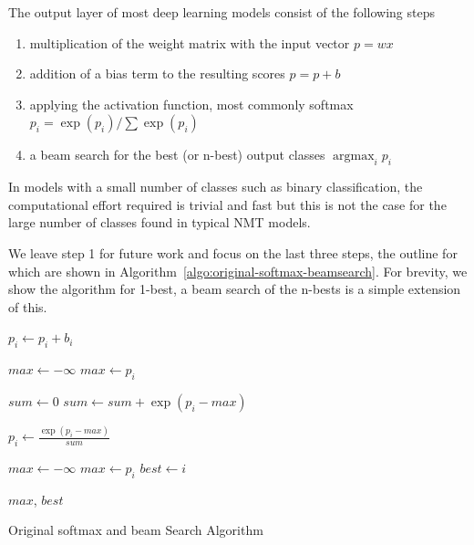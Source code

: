 \documentclass[11pt,a4paper]{article}
\DeclareMathOperator*{\argmax}{argmax}
\begin{document}
The output layer of most deep learning models consist of the following steps
\begin{enumerate}
   \item \vspace{-2 mm} multiplication of the weight matrix with the input vector $p = w x$
   \item \vspace{-2 mm} addition of a bias term to the resulting scores $p = p + b$
   \item \vspace{-2 mm} applying the activation function, most commonly softmax $ p_i = \exp(p_i) / \sum \exp(p_i) $
   \item \vspace{-2 mm} a beam search for the best (or n-best) output classes $\argmax_i p_i$
\end{enumerate}

In models with a small number of classes such as binary classification, the computational effort required is trivial and fast but this is not the case for the large number of classes found in typical NMT models.

We leave step 1 for future work and focus on the last three steps, the outline for which are shown in Algorithm~\ref{algo:original-softmax-beamsearch}. For brevity, we show the algorithm for 1-best, a beam search of the n-bests is a simple extension of this.

\begin{algorithm} 
\begin{algorithmic}

  \State $p_i \gets p_i + b_i$
\EndFor 
\EndProcedure

\State


\State $max \gets - \infty$ 
    \State $max \gets p_i$
  \EndIf
\EndFor

\State $sum \gets 0$ 
  \State $sum \gets sum + \exp(p_i - max)$
\EndFor

  \State $p_i \gets \frac{\exp(p_i - max)}{sum} $
\EndFor 

\EndProcedure

\State


\State $max \gets - \infty$ 
    \State $max \gets p_i$
    \State $best \gets i$
  \EndIf
\EndFor 

\Return $max$, $best$

\EndProcedure

\end{algorithmic}
\caption{Original softmax and beam Search Algorithm}
\label{algo:original-softmax-beamsearch}
\end{algorithm}
\end{document}
